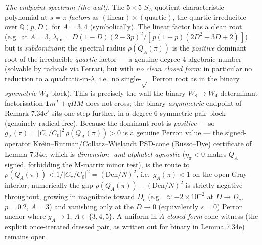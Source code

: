 \documentclass[
]{article}
\begin{document}
\emph{The endpoint spectrum (the wall).} The $5\times5$ $S_A$-quotient
characteristic polynomial at $s=\pi$ \emph{factors} as
$(\text{linear})\times(\text{quartic})$, the quartic irreducible over
$\mathbb Q(p,D)$ for $A=3,4$ (symbolically). The linear factor has a clean root
(e.g.\ at $A=3$, $\lambda_{\mathrm{lin}}=D(1-D)(2-3p)^2/[\,p(1-p)(2D^2-3D+2)\,]$)
but is \emph{subdominant}; the spectral radius $\rho(Q_A(\pi))$ is the
\emph{positive} dominant root of the irreducible \emph{quartic} factor --- a
genuine degree-$4$ algebraic number (solvable by radicals via Ferrari, but with
\emph{no clean closed form}: in particular no reduction to a quadratic-in-$\lambda$,
i.e.\ no single-$\sqrt{\,}$ Perron root as in the binary \emph{symmetric} $W_4$
block). This is precisely the wall the binary $W_8\to W_4$ determinant
factorisation $\mathbf1m^T+q\Pi M$ does not cross; the binary \emph{asymmetric}
endpoint of Remark 7.34e$'$ sits one step further, in a degree-$6$
symmetric-pair block (genuinely radical-free).
Because the dominant root is \emph{positive} --- so
$g_A(\pi)=|C_\pi/C_0|^2\,\rho(Q_A(\pi))>0$ is a genuine Perron value --- the
signed-operator Kre\u{\i}n--Rutman/Collatz--Wielandt PSD-cone (Russo--Dye)
certificate of Lemma 7.34e, which is \emph{dimension- and alphabet-agnostic}
($\eta_\pi<0$ makes $Q_A$ signed, forbidding the M-matrix minor test), is the
route to $\rho(Q_A(\pi))<1/|C_\pi/C_0|^2=(\mathrm{Den}/N)^2$, i.e.\
$g_A(\pi)<1$ on the open Gray interior; numerically the gap
$\rho(Q_A(\pi))-(\mathrm{Den}/N)^2$ is strictly negative throughout, growing in
magnitude toward $D_c$ (e.g.\ $\approx-2\times10^{-2}$ at $D\to D_c$, $p=0.2$,
$A=3$) and vanishing only at the $D\to0$ (equivalently $s=0$) Perron anchor where
$g_A\to1$, $A\in\{3,4,5\}$. A uniform-in-$A$ \emph{closed-form} cone witness (the
explicit once-iterated dressed pair, as written out for binary in Lemma 7.34e)
remains open.
\end{document}
